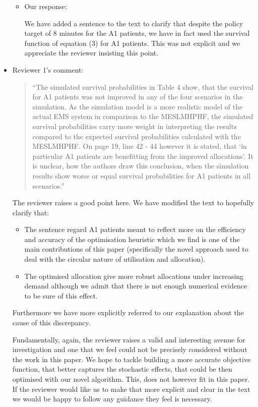 \documentclass{article}
\begin{document}
\begin{itemize}
\begin{itemize}
        \item Our response:

        We have added a sentence to the text to clarify that despite the policy target of 8 minutes for the A1 patients, we have in fact used the survival function of equation (3) for A1 patients. This was not explicit and we appreciate the reviewer insisting this point.

    \end{itemize}

    \item Reviewer 1's comment:

    \begin{quote}
    ``The simulated survival probabilities in Table 4 show, that the survival for A1 patients was not improved in any of the four scenarios in the simulation. As the simulation model is a more realistic model of the actual EMS system in comparison to the MESLMHPHF, the simulated survival probabilities carry more weight in interpreting the results compared to the expected survival probabilities calculated with the MESLMHPHF. On page 19, line 42 - 44 however it is stated, that ‘in particular A1 patients are benefitting from the improved allocations’. It is unclear, how the authors draw this conclusion, when the simulation results show worse or equal survival probabilities for A1 patients in all scenarios.''
    \end{quote}

    The reviewer raises a good point here. We have modified the text to hopefully clarify that:

    \begin{itemize}
        \item The sentence regard A1 patients meant to reflect more on the efficiency and accuracy of the optimisation heuristic which we find is one of the main contributions of this paper (specifically the novel approach used to deal with the circular nature of utilisation and allocation).
        \item The optimised allocation give more robust allocations under increasing demand although we admit that there is not enough numerical evidence to be sure of this effect.
    \end{itemize}

    Furthermore we have more explicitly referred to our explanation about the cause of this discrepancy.

    Fundamentally, again, the reviewer raises a valid and interesting avenue for investigation and one that we feel could not be precisely considered without the work in this paper. We hope to tackle building a more accurate objective function, that better captures the stochastic effects, that could be then optimised with our novel algorithm. This, does not however fit in this paper. If the reviewer would like us to make that more explicit and clear in the text we would be happy to follow any guidance they feel is necessary.


\end{itemize}
\end{document}
